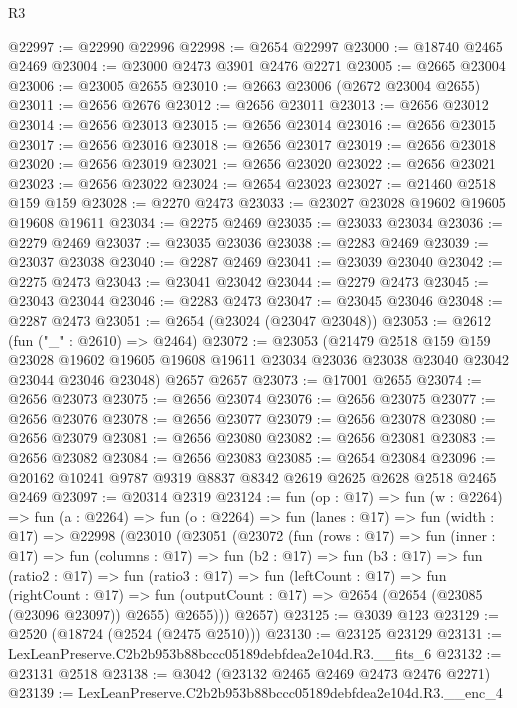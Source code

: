 \begin{lexlean}{R3}
\begin{coremodule}
@22997 := @22990 @22996
@22998 := @2654 @22997
@23000 := @18740 @2465 @2469
@23004 := @23000 @2473 @3901 @2476 @2271
@23005 := @2665 @23004
@23006 := @23005 @2655
@23010 := @2663 @23006 (@2672 @23004 @2655)
@23011 := @2656 @2676
@23012 := @2656 @23011
@23013 := @2656 @23012
@23014 := @2656 @23013
@23015 := @2656 @23014
@23016 := @2656 @23015
@23017 := @2656 @23016
@23018 := @2656 @23017
@23019 := @2656 @23018
@23020 := @2656 @23019
@23021 := @2656 @23020
@23022 := @2656 @23021
@23023 := @2656 @23022
@23024 := @2654 @23023
@23027 := @21460 @2518 @159 @159
@23028 := @2270 @2473
@23033 := @23027 @23028 @19602 @19605 @19608 @19611
@23034 := @2275 @2469
@23035 := @23033 @23034
@23036 := @2279 @2469
@23037 := @23035 @23036
@23038 := @2283 @2469
@23039 := @23037 @23038
@23040 := @2287 @2469
@23041 := @23039 @23040
@23042 := @2275 @2473
@23043 := @23041 @23042
@23044 := @2279 @2473
@23045 := @23043 @23044
@23046 := @2283 @2473
@23047 := @23045 @23046
@23048 := @2287 @2473
@23051 := @2654 (@23024 (@23047 @23048))
@23053 := @2612 (fun ("_" : @2610) => @2464)
@23072 := @23053
    (@21479
      @2518
      @159
      @159
      @23028
      @19602
      @19605
      @19608
      @19611
      @23034
      @23036
      @23038
      @23040
      @23042
      @23044
      @23046
      @23048)
    @2657
    @2657
@23073 := @17001 @2655
@23074 := @2656 @23073
@23075 := @2656 @23074
@23076 := @2656 @23075
@23077 := @2656 @23076
@23078 := @2656 @23077
@23079 := @2656 @23078
@23080 := @2656 @23079
@23081 := @2656 @23080
@23082 := @2656 @23081
@23083 := @2656 @23082
@23084 := @2656 @23083
@23085 := @2654 @23084
@23096 := @20162 @10241 @9787 @9319 @8837 @8342 @2619 @2625 @2628 @2518 @2465 @2469
@23097 := @20314 @2319
@23124 := fun (op : @17) =>
  fun (w : @2264) =>
  fun (a : @2264) =>
  fun (o : @2264) =>
  fun (lanes : @17) =>
  fun (width : @17) =>
  @22998
    (@23010
      (@23051
        (@23072
          (fun (rows : @17) =>
          fun (inner : @17) =>
          fun (columns : @17) =>
          fun (b2 : @17) =>
          fun (b3 : @17) =>
          fun (ratio2 : @17) =>
          fun (ratio3 : @17) =>
          fun (leftCount : @17) =>
          fun (rightCount : @17) =>
          fun (outputCount : @17) => @2654 (@2654 (@23085 (@23096 @23097)) @2655) @2655)))
      @2657)
@23125 := @3039 @123
@23129 := @2520 (@18724 (@2524 (@2475 @2510)))
@23130 := @23125 @23129
@23131 := LexLeanPreserve.C2b2b953b88bccc05189debfdea2e104d.R3.__fits_6
@23132 := @23131 @2518
@23138 := @3042 (@23132 @2465 @2469 @2473 @2476 @2271)
@23139 := LexLeanPreserve.C2b2b953b88bccc05189debfdea2e104d.R3.__enc_4

\end{coremodule}
\end{lexlean}
